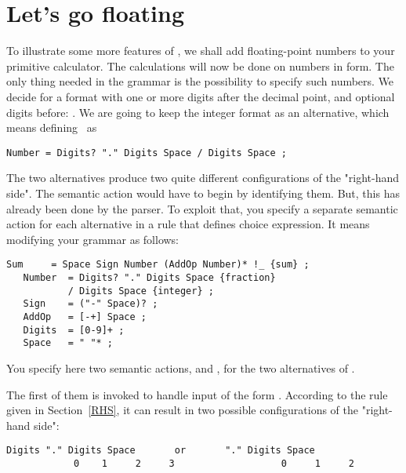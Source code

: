 
\section{Let's go floating}


To illustrate some more features of \Mouse,
we shall add floating-point numbers to your primitive calculator.
The calculations will now be done on numbers in  form.
The only thing needed in the grammar is the possibility to specify such numbers.
We decide for a format with one or more digits after the decimal point,
and optional digits before: .
We are going to keep the integer format as an alternative, 
which means defining \Number\ as

\small
\begin{Verbatim}[samepage=true,xleftmargin=15mm,baselinestretch=0.8]
         Number = Digits? "." Digits Space / Digits Space ;
\end{Verbatim}
\normalsize

The two alternatives produce two quite different configurations of the "right-hand side".
The semantic action would have to begin by identifying them.
But, this has already been done by the parser.
To exploit that, you specify a separate semantic action
for each alternative in a rule that defines choice expression.
It means modifying your grammar as follows:
%
\small
\begin{Verbatim}[frame=single,framesep=2mm,samepage=true,xleftmargin=15mm,xrightmargin=15mm,baselinestretch=0.8]
   Sum     = Space Sign Number (AddOp Number)* !_ {sum} ;
   Number  = Digits? "." Digits Space {fraction}
           / Digits Space {integer} ; 
   Sign    = ("-" Space)? ;
   AddOp   = [-+] Space ;
   Digits  = [0-9]+ ;
   Space   = " "* ;
\end{Verbatim}
\normalsize
%
You specify here two semantic actions,  and , 
for the two alternatives of \Number.

The first of them is invoked to handle input of the form .
According to the rule given in Section~\ref{RHS}, it can result
in two possible configurations of the "right-hand side":
 
\small
\begin{Verbatim}[samepage=true,xleftmargin=15mm,baselinestretch=0.9]
         Digits "." Digits Space       or       "." Digits Space
            0    1     2     3                   0     1     2
\end{Verbatim}
\normalsize
 
